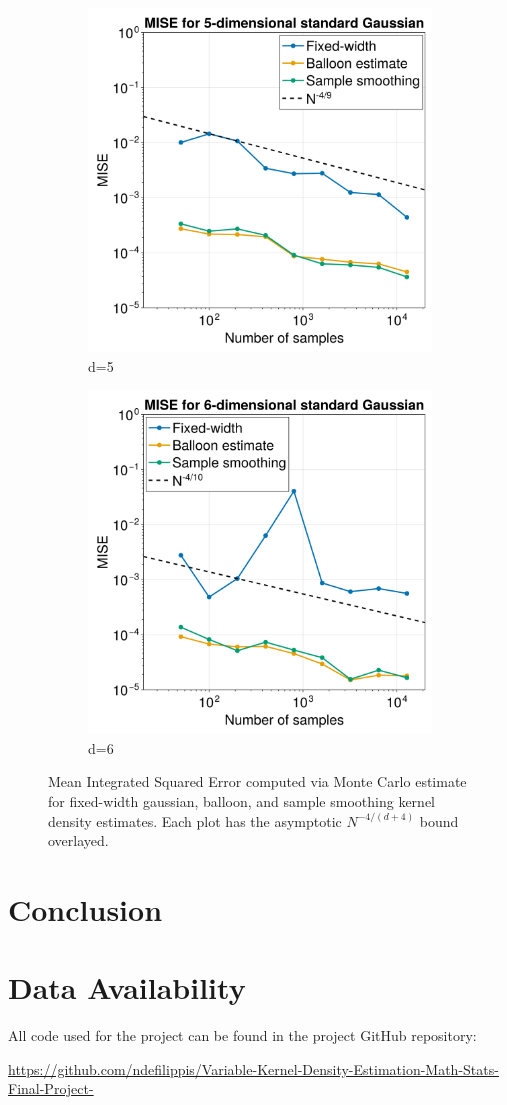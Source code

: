 \documentclass{article}
\begin{document}
\begin{figure}
\begin{subfigure}{.5\textwidth}
  \includegraphics[width=.8\linewidth]{images/MISE_d=5.png}
  \caption{d=5}
  \label{fig:MISE-5}
\end{subfigure}%
\begin{subfigure}{.5\textwidth}
  \centering
  \includegraphics[width=.8\linewidth]{images/MISE_d=6.png}
  \caption{d=6}
  \label{fig:MISE-6}
\end{subfigure}
\caption{Mean Integrated Squared Error computed via Monte Carlo estimate for fixed-width gaussian, balloon, and sample smoothing kernel density estimates. Each plot has the asymptotic $N^{-4/(d+4)}$ bound overlayed.}
\label{fig:MISE}
\end{figure}

\section{Conclusion}

\section{Data Availability}

All code used for the project can be found in the project GitHub repository:

\url{https://github.com/ndefilippis/Variable-Kernel-Density-Estimation-Math-Stats-Final-Project-}

\printbibliography
\end{document}
